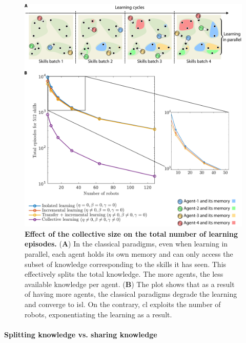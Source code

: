 \documentclass[12pt]{article}
\begin{document}
\begin{figure}[t!]
	\centering
	\hspace*{\fill}
	\includegraphics[width=16cm]{learning_paradigms_and_size_of_collective.png}
	\hspace*{\fill}
	\caption[] {\label{fig:learning_paradigms_and_size_of_collective} \textbf{Effect of the collective size on the total number of learning episodes.} {(\textbf{A}) In the classical paradigms, even when learning in parallel, each agent holds its own memory and can only access the subset of knowledge corresponding to the skills it has seen. This effectively splits the total knowledge. The more agents, the less available knowledge per agent. (\textbf{B}) The plot shows that as a result of having more agents, the classical paradigms degrade the learning and converge to \acl{isl}. On the contrary, \acl{cl} exploits the number of robots, exponentiating the learning as a result.}}
\end{figure}

\paragraph*{Splitting knowledge vs. sharing knowledge}
\end{document}
